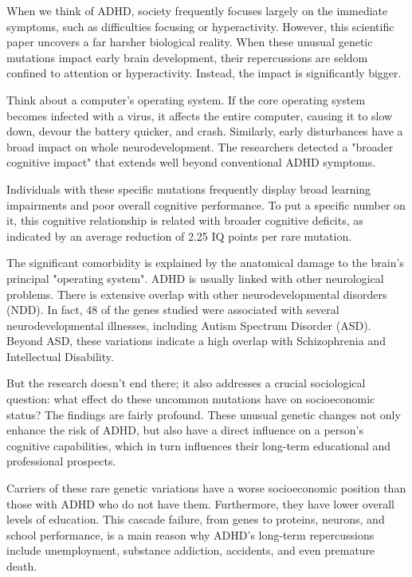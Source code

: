 When we think of ADHD, society frequently focuses largely on the immediate symptoms, such as difficulties focusing or hyperactivity.  However, this scientific paper uncovers a far harsher biological reality.  When these unusual genetic mutations impact early brain development, their repercussions are seldom confined to attention or hyperactivity.  Instead, the impact is significantly bigger.  

Think about a computer's operating system.  If the core operating system becomes infected with a virus, it affects the entire computer, causing it to slow down, devour the battery quicker, and crash.  Similarly, early disturbances have a broad impact on whole neurodevelopment.  The researchers detected a "broader cognitive impact" that extends well beyond conventional ADHD symptoms.  

Individuals with these specific mutations frequently display broad learning impairments and poor overall cognitive performance.  To put a specific number on it, this cognitive relationship is related with broader cognitive deficits, as indicated by an average reduction of 2.25 IQ points per rare mutation.  

The significant comorbidity is explained by the anatomical damage to the brain's principal "operating system".  ADHD is usually linked with other neurological problems.  There is extensive overlap with other neurodevelopmental disorders (NDD). 
In fact, 48 of the genes studied were associated with several neurodevelopmental illnesses, including Autism Spectrum Disorder (ASD).  Beyond ASD, these variations indicate a high overlap with Schizophrenia and Intellectual Disability.  

But the research doesn't end there; it also addresses a crucial sociological question: what effect do these uncommon mutations have on socioeconomic status?  The findings are fairly profound. 
These unusual genetic changes not only enhance the risk of ADHD, but also have a direct influence on a person's cognitive capabilities, which in turn influences their long-term educational and professional prospects.  

Carriers of these rare genetic variations have a worse socioeconomic position than those with ADHD who do not have them.  Furthermore, they have lower overall levels of education. 
This cascade failure, from genes to proteins, neurons, and school performance, is a main reason why ADHD's long-term repercussions include unemployment, substance addiction, accidents, and even premature death.  

